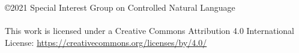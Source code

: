 \documentclass[11pt,a4paper]{article}
\begin{document}
\vfill
\large
\noindent
\copyright 2021 Special Interest Group on Controlled Natural Language\\
\hspace*{6.5mm} \\

\vspace*{15mm}
This work is licensed under a Creative Commons Attribution 4.0 International License: \url{https://creativecommons.org/licenses/by/4.0/}

\vspace*{6mm}
\end{document}
